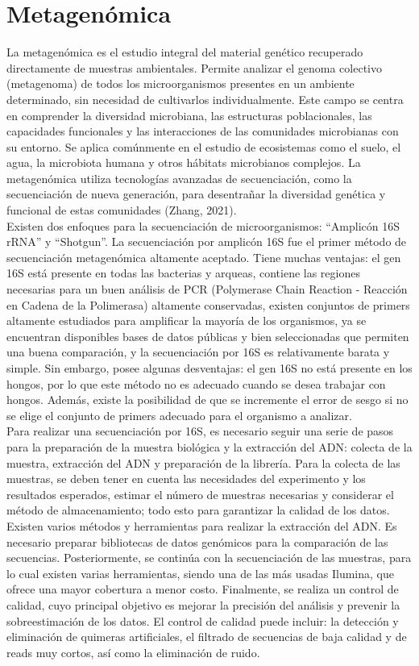 \section{Metagenómica}
La metagenómica es el estudio integral del material genético recuperado directamente de muestras ambientales. Permite analizar el genoma colectivo (metagenoma) de todos los microorganismos presentes en un ambiente determinado, sin necesidad de cultivarlos individualmente. Este campo se centra en comprender la diversidad microbiana, las estructuras poblacionales, las capacidades funcionales y las interacciones de las comunidades microbianas con su entorno. Se aplica comúnmente en el estudio de ecosistemas como el suelo, el agua, la microbiota humana y otros hábitats microbianos complejos. La metagenómica utiliza tecnologías avanzadas de secuenciación, como la secuenciación de nueva generación, para desentrañar la diversidad genética y funcional de estas comunidades (Zhang, 2021).\\

Existen dos enfoques para la secuenciación de microorganismos: “Amplicón 16S rRNA” y “Shotgun”. La secuenciación por amplicón 16S fue el primer método de secuenciación metagenómica altamente aceptado. Tiene muchas ventajas: el gen 16S está presente en todas las bacterias y arqueas, contiene las regiones necesarias para un buen análisis de PCR (Polymerase Chain Reaction - Reacción en Cadena de la Polimerasa) altamente conservadas, existen conjuntos de primers altamente estudiados para amplificar la mayoría de los organismos, ya se encuentran disponibles bases de datos públicas y bien seleccionadas que permiten una buena comparación, y la secuenciación por 16S es relativamente barata y simple. Sin embargo, posee algunas desventajas: el gen 16S no está presente en los hongos, por lo que este método no es adecuado cuando se desea trabajar con hongos. Además, existe la posibilidad de que se incremente el error de sesgo si no se elige el conjunto de primers adecuado para el organismo a analizar.\\

Para realizar una secuenciación por 16S, es necesario seguir una serie de pasos para la preparación de la muestra biológica y la extracción del ADN: colecta de la muestra, extracción del ADN y preparación de la librería. Para la colecta de las muestras, se deben tener en cuenta las necesidades del experimento y los resultados esperados, estimar el número de muestras necesarias y considerar el método de almacenamiento; todo esto para garantizar la calidad de los datos. Existen varios métodos y herramientas para realizar la extracción del ADN. Es necesario preparar bibliotecas de datos genómicos para la comparación de las secuencias. Posteriormente, se continúa con la secuenciación de las muestras, para lo cual existen varias herramientas, siendo una de las más usadas Ilumina, que ofrece una mayor cobertura a menor costo. Finalmente, se realiza un control de calidad, cuyo principal objetivo es mejorar la precisión del análisis y prevenir la sobreestimación de los datos. El control de calidad puede incluir: la detección y eliminación de quimeras artificiales, el filtrado de secuencias de baja calidad y de reads muy cortos, así como la eliminación de ruido.\\

